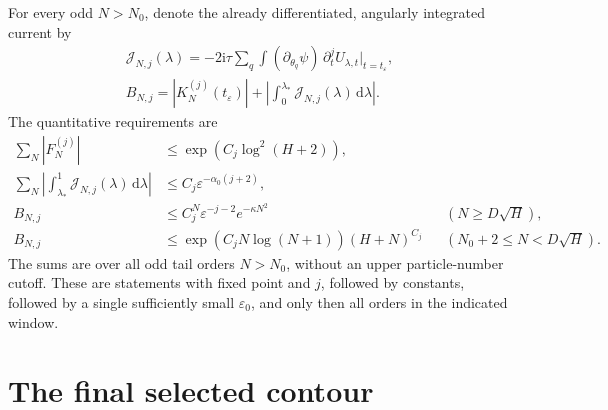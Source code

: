 \documentclass[11pt]{article}
\numberwithin{equation}{section}
\theoremstyle{definition}
\newcommand{\dd}{\,\mathrm d}
\newcommand{\ii}{\mathrm i}
\newcommand{\eps}{\varepsilon}
\begin{document}
For every odd $N>N_0$, denote the already differentiated,
angularly integrated current by
\begin{gather*}
 \mathcal J_{N,j}(\lambda)
   =-2\ii\tau\sum_q\int(\partial_{\theta_q}\psi)\,
              \partial_t^j U_{\lambda,t}\big|_{t=t_\eps},\\
 B_{N,j}=|K_N^{(j)}(t_\eps)|
       +\left|\int_0^{\lambda_*}\mathcal J_{N,j}(\lambda)\dd\lambda\right|.
\end{gather*}
The quantitative requirements are
\begin{align}
 \sum_N|F_N^{(j)}|
   &\le \exp(C_j\log^2(H+2)),\label{eq:reqF}\\
 \sum_N\left|\int_{\lambda_*}^1
               \mathcal J_{N,j}(\lambda)\dd\lambda\right|
   &\le C_j\eps^{-\alpha_0(j+2)},\label{eq:reqLS}\\
 B_{N,j}
   &\le C_j^N\eps^{-j-2}e^{-\kappa N^2}
             &&(N\ge D\sqrt H),\label{eq:reqhigh}\\
 B_{N,j}
   &\le \exp(C_jN\log(N+1))(H+N)^{C_j}
             &&(N_0+2\le N<D\sqrt H).\label{eq:reqinter}
\end{align}
The sums are over all odd tail orders \(N>N_0\), without an upper particle-number cutoff.
These are statements with fixed point and \(j\), followed by constants,
followed by a single sufficiently small \(\eps_0\), and only then all
orders in the indicated window.



\section{The final selected contour}
\label{sec:F}
\end{document}

